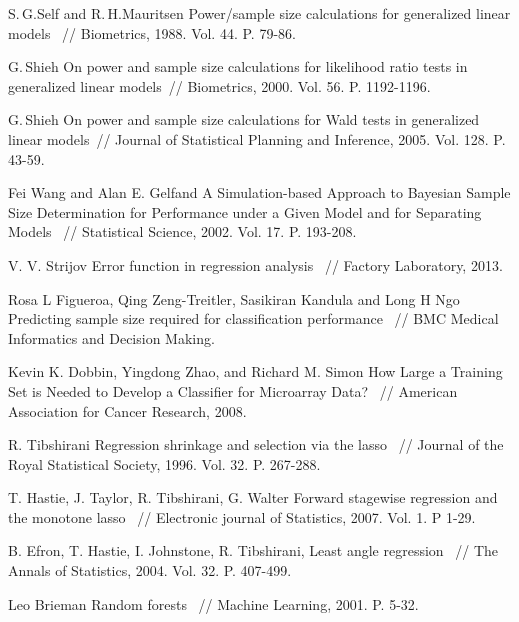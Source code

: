 \documentclass[12pt, a4paper]{scrartcl}
\theoremstyle{plain}
\theoremstyle{definition}
\begin{document}
\newpage
\begin{thebibliography}{1}

S.\,G.\;Self and R.\,H.\;Mauritsen Power/sample size calculations for generalized linear
models ~// Biometrics, 1988. Vol. 44. P. 79-86. 

G.\,Shieh On power and sample size calculations for likelihood ratio tests in generalized
linear models~// Biometrics, 2000. Vol. 56. P. 1192-1196.

G.\,Shieh On power and sample size calculations for Wald tests in generalized linear
models~// Journal of Statistical Planning and Inference, 2005. Vol. 128. P. 43-59.

Fei Wang and Alan E. Gelfand A Simulation-based Approach to Bayesian Sample Size
Determination for Performance under a Given Model and for Separating Models ~// Statistical Science, 2002. Vol. 17. P. 193-208.

V. V. Strijov Error function in regression analysis ~// Factory Laboratory, 2013. 

Rosa L Figueroa, Qing Zeng-Treitler, Sasikiran Kandula and Long H Ngo Predicting sample size required for classification
performance ~// BMC Medical Informatics and Decision Making.

Kevin K. Dobbin, Yingdong Zhao, and Richard M. Simon How Large a Training Set is Needed to Develop a Classifier for Microarray Data? ~// American Association for Cancer Research, 2008.

R. Tibshirani Regression shrinkage and selection via the lasso ~//  Journal of the Royal Statistical Society, 1996. Vol. 32. P. 267-288.

T. Hastie, J. Taylor, R. Tibshirani, G. Walter Forward stagewise regression and the monotone lasso ~// Electronic journal of Statistics, 2007. Vol. 1. P 1-29.

B. Efron, T. Hastie, I. Johnstone, R. Tibshirani, Least angle regression ~// The Annals of Statistics, 2004. Vol. 32. P. 407-499.

Leo Brieman Random forests ~// Machine Learning, 2001. P. 5-32.



\end{thebibliography}
\end{document}
